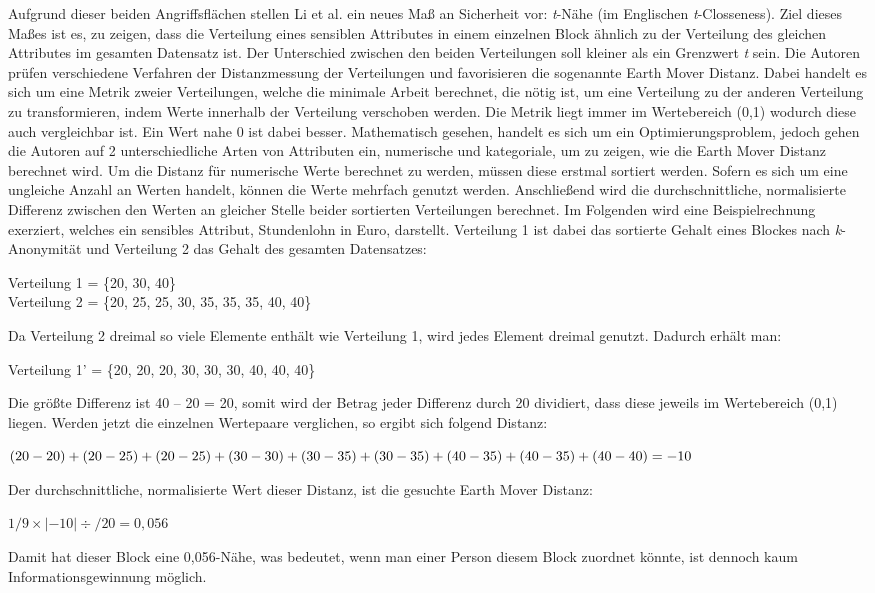Aufgrund dieser beiden Angriffsflächen stellen Li et al. \cite{P-25} ein neues Maß an Sicherheit vor: \textit{t}-Nähe (im Englischen \textit{t}-Closseness).
Ziel dieses Maßes ist es, zu zeigen, dass die Verteilung eines sensiblen Attributes in einem einzelnen Block ähnlich zu der Verteilung des gleichen Attributes im gesamten Datensatz ist.
Der Unterschied zwischen den beiden Verteilungen soll kleiner als ein Grenzwert \textit{t} sein.
Die Autoren prüfen verschiedene Verfahren der Distanzmessung der Verteilungen und favorisieren die sogenannte Earth Mover Distanz.
Dabei handelt es sich um eine Metrik zweier Verteilungen, welche die minimale Arbeit berechnet, die nötig ist, um eine Verteilung zu der anderen Verteilung zu transformieren, indem Werte innerhalb der Verteilung verschoben werden. 
Die Metrik liegt immer im Wertebereich (0,1) wodurch diese auch vergleichbar ist. 
Ein Wert nahe 0 ist dabei besser.
Mathematisch gesehen, handelt es sich um ein Optimierungsproblem, jedoch gehen die Autoren auf 2 unterschiedliche Arten von Attributen ein, numerische und kategoriale, um zu zeigen, wie die Earth Mover Distanz berechnet wird.
Um die Distanz für numerische Werte berechnet zu werden, müssen diese erstmal sortiert werden. 
Sofern es sich um eine ungleiche Anzahl an Werten handelt, können die Werte mehrfach genutzt werden.
Anschließend wird die durchschnittliche, normalisierte Differenz zwischen den Werten an gleicher Stelle beider sortierten Verteilungen berechnet.
Im Folgenden wird eine Beispielrechnung exerziert, welches ein sensibles Attribut, Stundenlohn in Euro, darstellt. 
Verteilung 1 ist dabei das sortierte Gehalt eines Blockes nach \textit{k}-Anonymität und Verteilung 2 das Gehalt des gesamten Datensatzes:
\begin{addmargin}[25pt]{0pt} Verteilung 1 = \{20, 30, 40\} \\
Verteilung 2 = \{20, 25, 25, 30, 35, 35, 35, 40, 40\} \end{addmargin}
Da Verteilung 2 dreimal so viele Elemente enthält wie Verteilung 1, wird jedes Element dreimal genutzt. 
Dadurch erhält man:
\begin{addmargin}[25pt]{0pt}Verteilung 1' = \{20, 20, 20, 30, 30, 30, 40, 40, 40\} \end{addmargin}
Die größte Differenz ist 40 – 20 = 20, somit wird der Betrag jeder Differenz durch 20 dividiert, dass diese jeweils im Wertebereich (0,1) liegen.
Werden jetzt die einzelnen Wertepaare verglichen, so ergibt sich folgend Distanz:
\begin{addmargin}[25pt]{0pt}
$ (20-20)+(20-25)+(20-25)+(30-30)+(30-35)+(30-35)+(40-35)+\\ (40-35) + (40-40) = -10$
\end{addmargin}
Der durchschnittliche, normalisierte Wert dieser Distanz, ist die gesuchte Earth Mover Distanz:
\begin{addmargin}[25pt]{0pt}
$ 1/9 \times  |-10| \div /20 = 0,056$
\end{addmargin}
Damit hat dieser Block eine 0,056-Nähe, was bedeutet, wenn man einer Person diesem Block zuordnet könnte, ist dennoch kaum Informationsgewinnung möglich.


